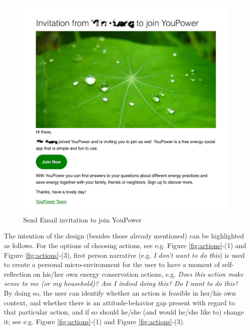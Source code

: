 \begin{figure}[t!]
\begin{center}
\begin{minipage}[t!]{0.65\linewidth}
         \includegraphics[width=1\linewidth]{img/invite2.jpg}    
        \end{minipage}
      \end{center}
      \caption{Send Email invitation to join YouPower }\label{fig:invite}
\end{figure}

The intention of the design (besides those already mentioned) can be highlighted as follows. For the options of choosing actions, see e.g. Figure \ref{fig:actions}-(1) and Figure \ref{fig:actions}-(3), first person narrative (e.g. \textit{I don't want to do this}) is used to create a personal micro-environment for the user \citep{Crumlish2009} to have a moment of self-reflection on his/her own energy conservation actions, e.g. \textit{Does this action make sense to me (or my household)? Am I indeed doing this? Do I want to do this?} By doing so, the user can identify whether an action is feasible in her/his own context, and whether there is an attitude-behavior gap present with regard to that particular action, and if so should he/she (and would he/she like to) change it; see e.g. Figure \ref{fig:actions}-(1) and Figure \ref{fig:actions}-(3). 

